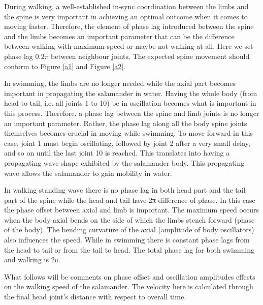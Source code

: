\documentclass{cmc}
\begin{document}
During walking, a well-established in-sync coordination between the limbs and the spine is very important in achieving an optimal outcome when it comes to moving faster. Therefore, the element of phase lag introduced between the spine and the limbs becomes an important parameter that can be the difference between walking with maximum speed or maybe not walking at all. Here we set phase lag $0.2\pi$ between neighbour joints. The expected spine movement should conform to Figure \ref{a1} and Figure \ref{a2}.

In swimming, the limbs are no longer needed while the axial part becomes important in propagating the salamander in water. Having the whole body (from head to tail, i.e. all joints 1 to 10) be in oscillation becomes what is important in this process. Therefore, a phase lag between the spine and limb joints is no longer an important parameter. Rather, the phase lag along all the body spine joints themselves becomes crucial in moving while swimming. To move forward in this case, joint 1 must begin oscillating, followed by joint 2 after a very small delay, and so on until the last joint 10 is reached. This translates into having a propagating wave shape exhibited by the salamander body. This propagating wave allows the salamander to gain mobility in water. 

In walking standing wave there is no phase lag in both head part and the tail part of the spine while the head and tail have 2π difference of phase. In this case the phase offset between axial and limb is important. The maximum speed occurs when the body axial bends on the side of which the limbs stench forward (phase of the body). The bending curvature of the axial (amplitude of body oscillators) also influences the speed. While in swimming there is constant phase lags from the head to tail or from the tail to head. The total phase lag for both swimming and walking is 2π.

What follows will be comments on phase offset and oscillation amplitudes effects on the walking speed of the salamander. The velocity here is calculated through the final head joint's distance with respect to overall time.
\end{document}
